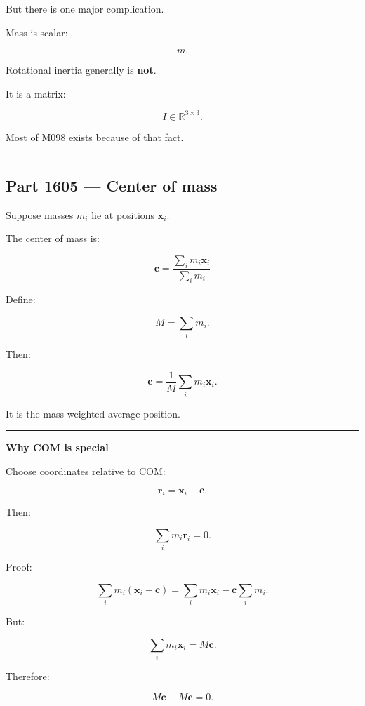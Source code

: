 But there is one major complication.

Mass is scalar:

\[
m.
\]

Rotational inertia generally is \textbf{not}.

It is a matrix:

\[
I\in\mathbb{R}^{3\times3}.
\]

Most of M098 exists because of that fact.

\begin{center}\rule{0.5\linewidth}{0.5pt}\end{center}

\subsection{Part 1605 --- Center of mass}\label{06-engine-ii-ch034-part-1605-center-of-mass}

\hypertarget{06-engine-ii-ch034-part-1605-center-of-mass}{}

Suppose masses \(m_i\) lie at positions \(\mathbf{x}_i\).

The center of mass is:

\[
\boxed{
\mathbf{c}
=
\frac{\sum_i m_i\mathbf{x}_i}
{\sum_i m_i}
}
\]

Define:

\[
M=\sum_i m_i.
\]

Then:

\[
\mathbf{c}
=
\frac{1}{M}
\sum_i
m_i\mathbf{x}_i.
\]

It is the mass-weighted average position.

\begin{center}\rule{0.5\linewidth}{0.5pt}\end{center}

\textbf{Why COM is special}

Choose coordinates relative to COM:

\[
\mathbf{r}_i
=
\mathbf{x}_i-\mathbf{c}.
\]

Then:

\[
\sum_i m_i\mathbf{r}_i
=
0.
\]

Proof:

\[
\sum_i m_i(\mathbf{x}_i-\mathbf{c})
=
\sum_i m_i\mathbf{x}_i
-
\mathbf{c}\sum_i m_i.
\]

But:

\[
\sum_i m_i\mathbf{x}_i
=
M\mathbf{c}.
\]

Therefore:

\[
M\mathbf{c}-M\mathbf{c}=0.
\]

